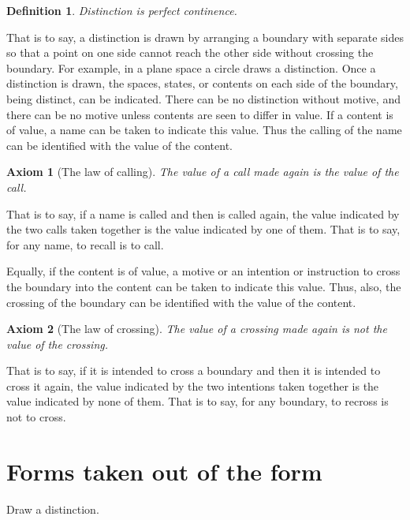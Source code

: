 \documentclass[a4paper]{article}
\newtheorem{definition}{Definition}
\newtheorem{axiom}{Axiom}
\theoremstyle{remark}
\begin{document}
\begin{definition}
Distinction is perfect continence.        
\end{definition}

That is to say, a distinction is drawn by arranging a boundary with separate sides so that a point on one side cannot reach the other side without crossing the boundary. For example, in a plane space a circle draws a distinction. Once a distinction is drawn, the spaces, states, or contents
on each side of the boundary, being distinct, can be indicated. There can be no distinction without motive, and there can be no motive unless contents are seen to differ in value. If a content is of value, a name can be taken to indicate this value. Thus the calling of the name can be identified with the value of the content.

\begin{axiom}[The law of calling]
    The value of a call made again is the value of the call.
\end{axiom}

That is to say, if a name is called and then is called again, the value indicated by the two calls taken together is the value indicated by one of them. That is to say, for any name, to recall is to call.

Equally, if the content is of value, a motive or an intention or instruction to cross the boundary into the content can be taken to indicate this value. Thus, also, the crossing of the boundary can be identified with the value of the content.

\begin{axiom}[The law of crossing]
    The value of a crossing made again is not the value of the crossing.
\end{axiom}

That is to say, if it is intended to cross a boundary and then it is intended to cross it again, the value indicated by the two intentions taken together is the value indicated by none of them. That is to say, for any boundary, to recross is not to cross.

\newpage
\section{Forms taken out of the form}


Draw a distinction.
\\\\
\end{document}
